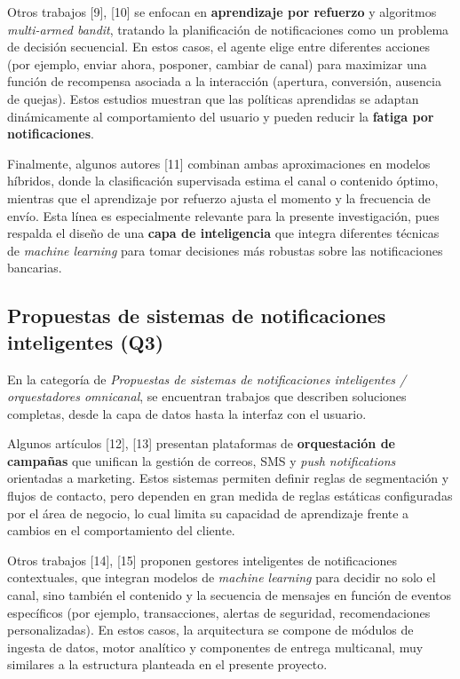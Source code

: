 \documentclass[conference]{IEEEtran}
\begin{document}
Otros trabajos [9], [10] se enfocan en \textbf{aprendizaje por refuerzo} y algoritmos \textit{multi-armed bandit}, tratando la planificación de notificaciones como un problema de decisión secuencial. En estos casos, el agente elige entre diferentes acciones (por ejemplo, enviar ahora, posponer, cambiar de canal) para maximizar una función de recompensa asociada a la interacción (apertura, conversión, ausencia de quejas). Estos estudios muestran que las políticas aprendidas se adaptan dinámicamente al comportamiento del usuario y pueden reducir la \textbf{fatiga por notificaciones}.

Finalmente, algunos autores [11] combinan ambas aproximaciones en modelos híbridos, donde la clasificación supervisada estima el canal o contenido óptimo, mientras que el aprendizaje por refuerzo ajusta el momento y la frecuencia de envío. Esta línea es especialmente relevante para la presente investigación, pues respalda el diseño de una \textbf{capa de inteligencia} que integra diferentes técnicas de \textit{machine learning} para tomar decisiones más robustas sobre las notificaciones bancarias.

\subsection{Propuestas de sistemas de notificaciones inteligentes (Q3)}

En la categoría de \textit{Propuestas de sistemas de notificaciones inteligentes / orquestadores omnicanal}, se encuentran trabajos que describen soluciones completas, desde la capa de datos hasta la interfaz con el usuario.

Algunos artículos [12], [13] presentan plataformas de \textbf{orquestación de campañas} que unifican la gestión de correos, SMS y \textit{push notifications} orientadas a marketing. Estos sistemas permiten definir reglas de segmentación y flujos de contacto, pero dependen en gran medida de reglas estáticas configuradas por el área de negocio, lo cual limita su capacidad de aprendizaje frente a cambios en el comportamiento del cliente.

Otros trabajos [14], [15] proponen gestores inteligentes de notificaciones contextuales, que integran modelos de \textit{machine learning} para decidir no solo el canal, sino también el contenido y la secuencia de mensajes en función de eventos específicos (por ejemplo, transacciones, alertas de seguridad, recomendaciones personalizadas). En estos casos, la arquitectura se compone de módulos de ingesta de datos, motor analítico y componentes de entrega multicanal, muy similares a la estructura planteada en el presente proyecto.
\end{document}
